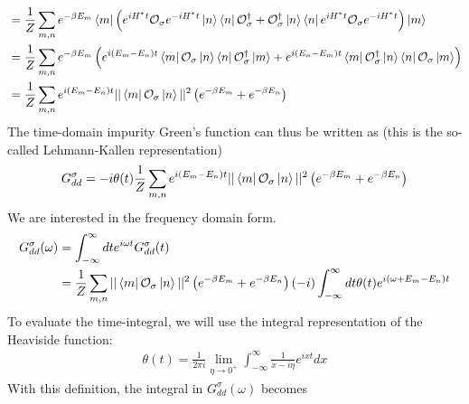\documentclass[10pt]{report}
\numberwithin{equation}{section}
\begin{document}
\begin{appendices}
\begin{equation}
\begin{aligned}
	&= \frac{1}{Z}\sum_{m,n}e^{-\beta E_m}\bra{m}\left( e^{iH^* t}\mathcal{O}_{\sigma}e^{-iH^* t}\ket{n}\bra{n}\mathcal{O}^\dagger_{\sigma} + \mathcal{O}^\dagger_{\sigma}\ket{n}\bra{n}e^{iH^* t}\mathcal{O}_{\sigma}e^{-iH^* t}\right) \ket{m}\\
	&= \frac{1}{Z}\sum_{m,n}e^{-\beta E_m}\left( e^{i\left( E_m - E_n \right)  t}\bra{m}\mathcal{O}_{\sigma}\ket{n}\bra{n}\mathcal{O}^\dagger_{\sigma} \ket{m} + e^{i\left( E_n - E_m \right)  t}\bra{m}\mathcal{O}^\dagger_{\sigma}\ket{n}\bra{n}\mathcal{O}_{\sigma} \ket{m}\right)\\
	&= \frac{1}{Z}\sum_{m,n}e^{i\left( E_m - E_n \right)  t}||\bra{m}\mathcal{O}_{\sigma}\ket{n}||^2\left( e^{-\beta E_m} + e^{-\beta E_n}\right)\\
\end{aligned}\end{equation}
The time-domain impurity Green's function can thus be written as (this is the so-called Lehmann-Kallen representation)
\begin{equation}\begin{aligned}
	G_{dd}^\sigma = -i\theta(t)\frac{1}{Z}\sum_{m,n}e^{i\left( E_m - E_n \right)  t}||\bra{m}\mathcal{O}_{\sigma}\ket{n}||^2\left( e^{-\beta E_m} + e^{-\beta E_n}\right)\\
\end{aligned}\end{equation}
We are interested in the frequency domain form.
\begin{equation}\begin{aligned}
	G_{d d}^\sigma(\omega) &= \int_{-\infty}^\infty dt e^{i \omega t}G_{d d}^\sigma(t) \\
			       &= \frac{1}{Z}\sum_{m,n}||\bra{m}\mathcal{O}_{\sigma}\ket{n}||^2\left( e^{-\beta E_m} + e^{-\beta E_n}\right)\left(-i\right)\int_{-\infty}^\infty dt \theta(t)e^{i\left( \omega + E_m - E_n \right)t}
\end{aligned}\end{equation}
To evaluate the time-integral, we will use the integral representation of the Heaviside function:
\begin{equation}\begin{aligned}
	\theta(t) = \frac{1}{2\pi i}\lim_{\eta \to 0^+} \int_{-\infty}^\infty \frac{1}{x- i\eta}e^{ixt}dx
\end{aligned}\end{equation}
With this definition, the integral in \(G_{dd}^\sigma(\omega)\) becomes
\begin{equation}\begin{aligned}

\end{aligned}
\end{equation}
\end{appendices}
\end{document}
